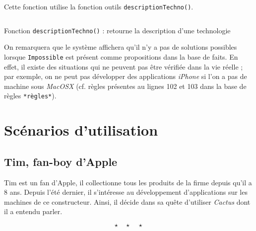 \documentclass[a4paper,12pt]{article}
\begin{document}
Cette fonction utilise la fonction outils \texttt{descriptionTechno()}.


\begin{listing}[H]
	\centering
	\inputminted[breaklines=true,linenos,firstline=12]{lisp}{../afficherPropositions.lisp}
	\caption{Fonction \texttt{descriptionTechno()} : retourne la description d'une technologie}
\end{listing}


On remarquera que le système affichera qu'il n'y a pas de solutions possibles lorsque \texttt{Impossible} est présent comme propositions dans la base de faits. En effet, il existe des situations qui ne peuvent pas être vérifiée dans la vie réelle ; par exemple, on ne peut pas développer des applications \textit{iPhone} si l'on a pas de machine sous \textit{MacOSX} (cf. règles présentes au lignes 102 et 103 dans la base de règles \texttt{*règles*}).

\newpage

\section{Scénarios d'utilisation}

	\subsection{Tim, fan-boy d'Apple}
	
	Tim est un fan d'Apple, il collectionne tous les produits de la firme depuis qu'il a 8 ans. Depuis l'été dernier, il s'intéresse au développement d'applications sur les machines de ce constructeur. Ainsi, il décide dans sa quête d'utiliser \textit{Cactus} dont il a entendu parler.

\[ \star \quad \star \quad \star \]
\newpage

\end{document}
